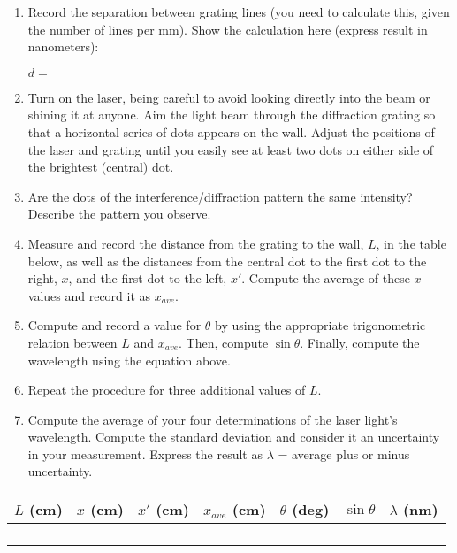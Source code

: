 \begin{enumerate}[wide, label=(\emph{\alph*})]
\item Record the separation between grating lines (you need to calculate this, given the number of lines per mm). Show the calculation here (express result in nanometers):

\( d= \)
\vspace{10mm}
\item Turn on the laser, being careful to avoid looking directly into the
beam or shining it at anyone. Aim the light beam through the diffraction
grating so that a horizontal series of dots appears on the wall. Adjust
the positions of the laser and grating until you easily see at least
two dots on either side of the brightest (central) dot.
\item Are the dots of the interference/diffraction pattern the same intensity?
Describe the pattern you observe.\vspace{15mm}

\item Measure and record the distance from the grating to the wall, $L$, in 
the table below, as well as the distances from the central dot to the first 
dot to the right, $x$, and the first dot to the left, $x'$. Compute the average
of these $x$ values and record it as $x_{ave}$.
\item Compute and record a value for $\theta$ by using the appropriate 
trigonometric relation between $L$ and $x_{ave}$. Then, compute $\sin \theta$. 
Finally, compute the wavelength using the equation above.
\item Repeat the procedure for three additional values of $L$.
\item Compute the average of your four determinations of the laser light's
wavelength. Compute the standard deviation and consider it an uncertainty in 
your measurement. Express the result as $\lambda$ = average plus or minus 
uncertainty.

\end{enumerate}
\vspace{15mm}
\begin{center}
\begin{tabular}{|c|c|c|c|c|c|c|}
\hline 
\( L \) (cm)&
\( x \) (cm)&
\( x' \) (cm)&
\( x_{ave} \) (cm)&
\( \theta  \) (deg)&
\( \sin \theta  \)&
\( \lambda  \) (nm)\\
\hline
\hline 
&
&
&
&
&
&
\\
\hline 
&
&
&
&
&
&
\\
\hline 
&
&
&
&
&
&
\\
\hline 
&
&
&
&
&
&
\\
\hline
\end{tabular}\vspace{0.3cm}

\end{center}
